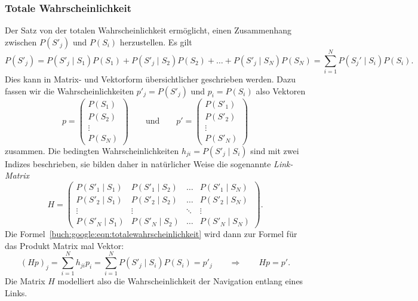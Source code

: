 \subsubsection{Totale Wahrscheinlichkeit}
Der Satz von der totalen Wahrscheinlichkeit ermöglicht, einen Zusammenhang
%
%
zwischen $P(S'_j)$ und $P(S_i)$ herzustellen.
Es gilt
\begin{equation}
P(S'_j)
=
P(S'_j\mid S_1) P(S_1)
+
P(S'_j\mid S_2) P(S_2)
+
\dots
+
P(S'_j\mid S_N) P(S_N)
=
\sum_{i=1}^N P(S_j'\mid S_i)P(S_i)
.
\label{buch:google:eqn:totalewahrscheinlichkeit}
\end{equation}
Dies kann in Matrix- und Vektorform übersichtlicher geschrieben werden.
Dazu fassen wir die Wahrscheinlichkeiten $p'_j=P(S'_j)$ und $p_i=P(S_i)$
also Vektoren
\[
p
=
\begin{pmatrix}
P(S_1)\\
P(S_2)\\
\vdots\\
P(S_N)
\end{pmatrix}
\qquad
\text{und}
\qquad
p'
=
\begin{pmatrix}
P(S'_1)\\
P(S'_2)\\
\vdots\\
P(S'_N)
\end{pmatrix}
\]
zusammen.
Die bedingten Wahrscheinlichkeiten $h_{ji}=P(S'_j\mid S_i)$ sind mit zwei Indizes
beschrieben, sie bilden daher in natürlicher Weise die sogenannte
{\em Link-Matrix}
%
\begin{equation}
H
=
\begin{pmatrix}
P(S'_1\mid S_1)&P(S'_1\mid S_2)&\dots &P(S'_1\mid S_N)\\
P(S'_2\mid S_1)&P(S'_2\mid S_2)&\dots &P(S'_2\mid S_N)\\
\vdots     &\vdots     &\ddots&\vdots     \\
P(S'_N\mid S_1)&P(S'_N\mid S_2)&\dots &P(S'_N\mid S_N)
\end{pmatrix}.
\label{buch:google:eqn:linkmatrix}
\end{equation}
Die Formel~\eqref{buch:google:eqn:totalewahrscheinlichkeit} wird dann zur
Formel für das Produkt Matrix mal Vektor:
\[
(Hp)_j
=
\sum_{i=1}^N h_{ji} p_i
=
\sum_{i=1}^N P(S'_j\mid S_i) P(S_i)
=
p'_j
\qquad\Rightarrow\qquad
Hp=p'.
\]
Die Matrix $H$ modelliert also die Wahrscheinlichkeit der Navigation
entlang eines Links.

